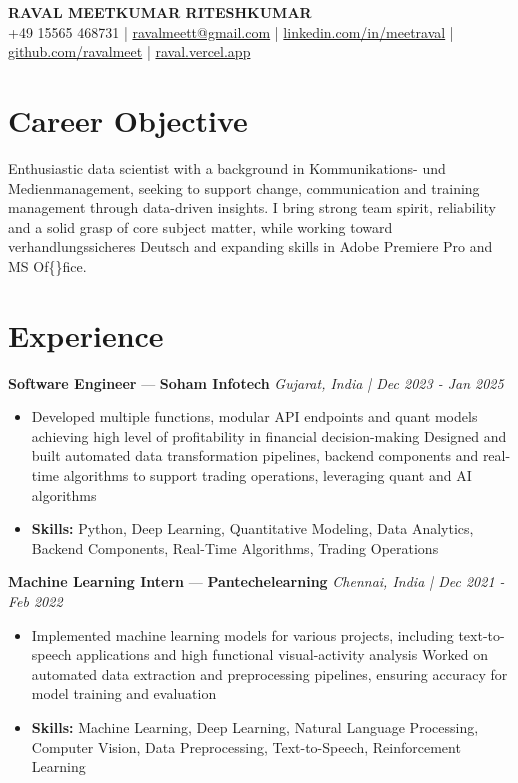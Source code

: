 \documentclass[a4paper,10pt]{article}
\begin{document}
\begin{center}
  {\Large\bfseries RAVAL MEETKUMAR RITESHKUMAR}\\[2pt]
  {\small +49 15565 468731 \;|\; \href{mailto:ravalmeett@gmail.com}{ravalmeett@gmail.com} \;|\; \href{https://www.linkedin.com/in/meetraval/}{linkedin.com/in/meetraval} \;|\; \href{https://github.com/ravalmeet}{github.com/ravalmeet} \;|\; \href{https://raval.vercel.app/}{raval.vercel.app}}
\end{center}
\vspace{-3pt}

\section*{Career Objective}
Enthusiastic data scientist with a background in Kommunikations- und Medienmanagement, seeking to support change, communication and training management through data-driven insights. I bring strong team spirit, reliability and a solid grasp of core subject matter, while working toward verhandlungssicheres Deutsch and expanding skills in Adobe Premiere Pro and MS Of\{\}fice.\par

\section*{Experience}
\textbf{Software Engineer} — \textbf{Soham Infotech} \hfill \textit{Gujarat, India \;|\; Dec 2023 - Jan 2025}\par
\vspace{1pt}
\begin{itemize}
  \item Developed multiple functions, modular API endpoints and quant models achieving high level of profitability in financial decision-making Designed and built automated data transformation pipelines, backend components and real-time algorithms to support trading operations, leveraging quant and AI algorithms
  \item \textbf{Skills:} Python, Deep Learning, Quantitative Modeling, Data Analytics, Backend Components, Real-Time Algorithms, Trading Operations
\end{itemize}
\vspace{3pt}
\textbf{Machine Learning Intern} — \textbf{Pantechelearning} \hfill \textit{Chennai, India \;|\; Dec 2021 - Feb 2022}\par
\vspace{1pt}
\begin{itemize}
  \item Implemented machine learning models for various projects, including text-to-speech applications and high functional visual-activity analysis Worked on automated data extraction and preprocessing pipelines, ensuring accuracy for model training and evaluation
  \item \textbf{Skills:} Machine Learning, Deep Learning, Natural Language Processing, Computer Vision, Data Preprocessing, Text-to-Speech, Reinforcement Learning
\end{itemize}
\end{document}
